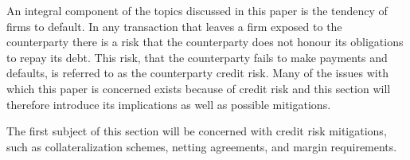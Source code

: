 \documentclass[main.tex]{subfiles}
\begin{document}
    An integral component of the topics discussed in this paper is the tendency of firms to default.
    In any transaction that leaves a firm exposed to the counterparty
    there is a risk that the counterparty does not honour its obligations to repay its debt.
    This risk, that the counterparty fails to make payments and defaults, 
    is referred to as the counterparty credit risk.
    Many of the issues with which this paper is concerned exists because of credit risk 
    and this section will therefore introduce its implications as well as possible mitigations.

    The first subject of this section will be concerned with credit risk mitigations,
    such as collateralization schemes, netting agreements, and margin requirements.
\end{document}
